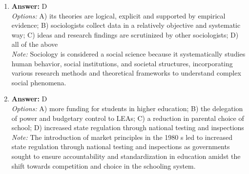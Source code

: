\documentclass[12pt]{article}
\begin{document}
\begin{enumerate}[label=\arabic*.]
\item \textbf{Answer:} D
\\ \textit{Options:} A) its theories are logical, explicit and supported by empirical evidence; B) sociologists collect data in a relatively objective and systematic way; C) ideas and research findings are scrutinized by other sociologists; D) all of the above
\\ \textit{Note:} Sociology is considered a social science because it systematically studies human behavior, social institutions, and societal structures, incorporating various research methods and theoretical frameworks to understand complex social phenomena.
\item \textbf{Answer:} D
\\ \textit{Options:} A) more funding for students in higher education; B) the delegation of power and budgetary control to LEAs; C) a reduction in parental choice of school; D) increased state regulation through national testing and inspections
\\ \textit{Note:} The introduction of market principles in the 1980 s led to increased state regulation through national testing and inspections as governments sought to ensure accountability and standardization in education amidst the shift towards competition and choice in the schooling system.
\end{enumerate}
\end{document}

